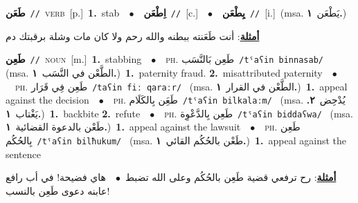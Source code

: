 \documentclass[10pt,a4paper,twoside]{article} %
\begin{document}
\begin{multicols}{2}
{\setlength\topsep{0pt}\textbf{\foreignlanguage{arabic}{طَعَن}}\ {\color{gray}\texttt{//}\color{black}}\ \textsc{verb}\ [p.]\ \textbf{1.}~stab\ \ $\bullet$\ \ \setlength\topsep{0pt}\textbf{\foreignlanguage{arabic}{اِطْعَن}}\ {\color{gray}\texttt{//}\color{black}}\ [c.]\ \ $\bullet$\ \ \setlength\topsep{0pt}\textbf{\foreignlanguage{arabic}{يِطْعَن}}\ {\color{gray}\texttt{//}\color{black}}\ [i.]\ \color{gray}(msa. \foreignlanguage{arabic}{يَطْعَن}~\foreignlanguage{arabic}{\textbf{١.}})\color{black}\  \begin{flushright}\color{gray}\foreignlanguage{arabic}{\textbf{\underline{\foreignlanguage{arabic}{أمثلة}}}: أنت طَعَنته ببطنه والله رحم ولا كان مات وشلة برقبتك دم}\end{flushright}\color{black}} \vspace{2mm}

{\setlength\topsep{0pt}\textbf{\foreignlanguage{arabic}{طَعِن}}\ {\color{gray}\texttt{//}\color{black}}\ \textsc{noun}\ [m.]\ \textbf{1.}~stabbing\ \ $\bullet$\ \ \textsc{ph.} \color{gray} \foreignlanguage{arabic}{طَعِن بَالنَّسَب}\color{black}\ {\color{gray}\texttt{/{\sffamily tˤaʕin binnasab}/}\color{black}}\ \color{gray} (msa. \foreignlanguage{arabic}{الطَّعْن في النَّسَب}~\foreignlanguage{arabic}{\textbf{١.}})\color{black}\ \textbf{1.}~paternity fraud.  \textbf{2.}~misattributed paternity\ \ $\bullet$\ \ \textsc{ph.} \color{gray} \foreignlanguage{arabic}{طَعِن فِي قَرَار}\color{black}\ {\color{gray}\texttt{/{\sffamily taʕin fiː qaraːr}/}\color{black}}\ \color{gray} (msa. \foreignlanguage{arabic}{الطَّعْن في القرار}~\foreignlanguage{arabic}{\textbf{١.}})\color{black}\ \textbf{1.}~appeal against the decision\ \ $\bullet$\ \ \textsc{ph.} \color{gray} \foreignlanguage{arabic}{طَعَِن بِالكَلَام}\color{black}\ {\color{gray}\texttt{/{\sffamily tˤaʕin bilkalaːm}/}\color{black}}\ \color{gray} (msa. \foreignlanguage{arabic}{يُدْحِض}~\foreignlanguage{arabic}{\textbf{٢.}}  \foreignlanguage{arabic}{يَغْتاب}~\foreignlanguage{arabic}{\textbf{١.}})\color{black}\ \textbf{1.}~backbite  \textbf{2.}~refute\ \ $\bullet$\ \ \textsc{ph.} \color{gray} \foreignlanguage{arabic}{طَعِن بِالدَّعْوِة}\color{black}\ {\color{gray}\texttt{/{\sffamily tˤaʕin biddaʕwa}/}\color{black}}\ \color{gray} (msa. \foreignlanguage{arabic}{طَعْن بالدعوة القضائية}~\foreignlanguage{arabic}{\textbf{١.}})\color{black}\ \textbf{1.}~appeal against the lawsuit\ \ $\bullet$\ \ \textsc{ph.} \color{gray} \foreignlanguage{arabic}{طَعِن بِالحُكُم}\color{black}\ {\color{gray}\texttt{/{\sffamily tˤaʕin bilħukum}/}\color{black}}\ \color{gray} (msa. \foreignlanguage{arabic}{طَعْن بالحُكُم القائي}~\foreignlanguage{arabic}{\textbf{١.}})\color{black}\ \textbf{1.}~appeal against the sentence\  \begin{flushright}\color{gray}\foreignlanguage{arabic}{\textbf{\underline{\foreignlanguage{arabic}{أمثلة}}}: رح ترفعي قضية طَعِن بالحُكُم وعلى الله تضبط\ $\bullet$\ \  هاي فضيحة! في أب رافع عابنه دعوى طَعِن بالنسب!}\end{flushright}\color{black}} \vspace{2mm}


\end{multicols}
\end{document}
